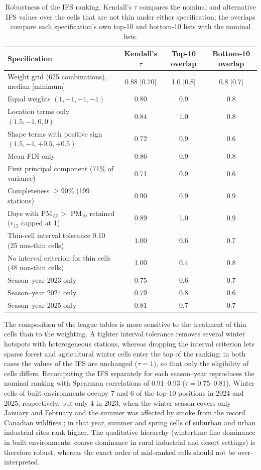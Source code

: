 \documentclass[a4paper,fleqn]{cas-sc}
\begin{document}
\begin{table}[!htbp]
\centering
\footnotesize
\caption{Robustness of the IFS ranking. Kendall's $\tau$ compares the nominal and alternative IFS values over the cells that are not thin under either specification; the overlaps compare each specification's own top-10 and bottom-10 lists with the nominal lists.}
\label{tab:ifs_robustness}
\begin{tabular}{p{6.6cm}ccc}
\toprule
\textbf{Specification} & \textbf{Kendall's $\tau$} & \textbf{Top-10 overlap} & \textbf{Bottom-10 overlap} \\
\midrule
Weight grid (625 combinations), median [minimum] & 0.88 [0.70] & 1.0 [0.8] & 0.8 [0.7] \\
Equal weights $(1,-1,-1,-1)$ & 0.80 & 0.9 & 0.8 \\
Location terms only $(1.5,-1,0,0)$ & 0.84 & 1.0 & 0.8 \\
Shape terms with positive sign $(1.5,-1,+0.5,+0.5)$ & 0.72 & 0.9 & 0.6 \\
Mean FDI only & 0.86 & 0.9 & 0.8 \\
First principal component (71\% of variance) & 0.71 & 0.9 & 0.6 \\
\midrule
Completeness $\geq$90\% (199 stations) & 0.90 & 0.9 & 0.9 \\
Days with PM$_{2.5}>$ PM$_{10}$ retained ($r_{12}$ capped at 1) & 0.89 & 1.0 & 0.9 \\
Thin-cell interval tolerance 0.10 (25 non-thin cells) & 1.00 & 0.6 & 0.7 \\
No interval criterion for thin cells (48 non-thin cells) & 1.00 & 0.4 & 0.8 \\
\midrule
Season--year 2023 only & 0.75 & 0.6 & 0.7 \\
Season--year 2024 only & 0.79 & 0.8 & 0.6 \\
Season--year 2025 only & 0.81 & 0.7 & 0.7 \\
\bottomrule
\end{tabular}
\end{table}

The composition of the league tables is more sensitive to the treatment of thin cells than to the weighting. A tighter interval tolerance removes several winter hotspots with heterogeneous stations, whereas dropping the interval criterion lets sparse forest and agricultural winter cells enter the top of the ranking; in both cases the values of the IFS are unchanged ($\tau=1$), so that only the eligibility of cells differs. Recomputing the IFS separately for each season--year reproduces the nominal ranking with Spearman correlations of 0.91--0.93 ($\tau=0.75$--$0.81$). Winter cells of built environments occupy 7 and 6 of the top-10 positions in 2024 and 2025, respectively, but only 4 in 2023, when the winter season covers only January and February and the summer was affected by smoke from the record Canadian wildfires \citep{Wang2024}; in that year, summer and spring cells of suburban and urban industrial sites rank higher. The qualitative hierarchy (wintertime fine dominance in built environments, coarse dominance in rural industrial and desert settings) is therefore robust, whereas the exact order of mid-ranked cells should not be over-interpreted.
\end{document}
